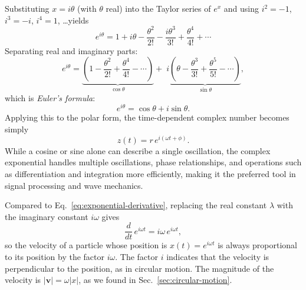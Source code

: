 \documentclass[12pt]{article}
\theoremstyle{remark}
\begin{document}
Substituting $x = i\theta$ (with $\theta$ real) into the Taylor series of $e^x$ and
using $i^{2}=-1$, $i^{3}=-i$, $i^{4}=1$, \ldots yields
\begin{equation}
    e^{i\theta}
      = 1 + i\theta - \frac{\theta^{2}}{2!} - \frac{i\theta^{3}}{3!}
        + \frac{\theta^{4}}{4!} + \cdots
\end{equation}
Separating real and imaginary parts:
\begin{equation}
    e^{i\theta}
      = \underbrace{\left(1-\frac{\theta^{2}}{2!}+\frac{\theta^{4}}{4!}-\cdots
                   \right)}_{\cos\theta}
      + \;i\underbrace{\left(\theta-\frac{\theta^{3}}{3!}+\frac{\theta^{5}}{5!}
                             -\cdots\right)}_{\sin\theta},
\end{equation}
which is \emph{Euler's formula}:
\begin{equation}
    e^{i\theta} = \cos\theta + i\sin\theta.
\end{equation}
Applying this to the polar form, the time-dependent complex number becomes simply
\begin{equation}
    z(t) = r\,e^{i(\omega t+\phi)}.
\end{equation}
While a cosine or sine alone can describe a single oscillation, the complex exponential
handles multiple oscillations, phase relationships, and operations such as differentiation
and integration more efficiently, making it the preferred tool in signal processing and
wave mechanics.


Compared to Eq.~\eqref{eq:exponential-derivative}, replacing the real constant $\lambda$ with the imaginary constant $i\omega$ gives
\begin{equation}
    \frac{d}{dt}\,e^{i\omega t} = i\omega\,e^{i\omega t},
\end{equation}
so the velocity of a particle whose position is $x(t)=e^{i\omega t}$ is always proportional to its position by the factor $i\omega$. The factor $i$ indicates that the velocity is perpendicular to the position, as in circular motion. The magnitude of the velocity is $|\mathbf{v}| = \omega |x|$, as we found in Sec.~\ref{sec:circular-motion}.
\end{document}
